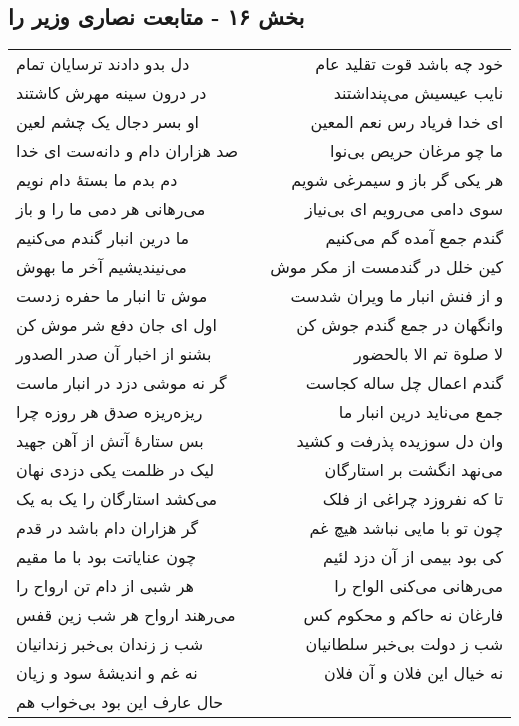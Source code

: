 \begin{center}
\section*{بخش ۱۶ - متابعت نصاری وزیر را}
\label{sec:sh016}
\begin{longtable}{l p{0.5cm} r}
دل بدو دادند ترسایان تمام
&&
خود چه باشد قوت تقلید عام
\\
در درون سینه مهرش کاشتند
&&
نایب عیسیش می‌پنداشتند
\\
او بسر دجال یک چشم لعین
&&
ای خدا فریاد رس نعم المعین
\\
صد هزاران دام و دانه‌ست ای خدا
&&
ما چو مرغان حریص بی‌نوا
\\
دم بدم ما بستهٔ دام نویم
&&
هر یکی گر باز و سیمرغی شویم
\\
می‌رهانی هر دمی ما را و باز
&&
سوی دامی می‌رویم ای بی‌نیاز
\\
ما درین انبار گندم می‌کنیم
&&
گندم جمع آمده گم می‌کنیم
\\
می‌نیندیشیم آخر ما بهوش
&&
کین خلل در گندمست از مکر موش
\\
موش تا انبار ما حفره زدست
&&
و از فنش انبار ما ویران شدست
\\
اول ای جان دفع شر موش کن
&&
وانگهان در جمع گندم جوش کن
\\
بشنو از اخبار آن صدر الصدور
&&
لا صلوة تم الا بالحضور
\\
گر نه موشی دزد در انبار ماست
&&
گندم اعمال چل ساله کجاست
\\
ریزه‌ریزه صدق هر روزه چرا
&&
جمع می‌ناید درین انبار ما
\\
بس ستارهٔ آتش از آهن جهید
&&
وان دل سوزیده پذرفت و کشید
\\
لیک در ظلمت یکی دزدی نهان
&&
می‌نهد انگشت بر استارگان
\\
می‌کشد استارگان را یک به یک
&&
تا که نفروزد چراغی از فلک
\\
گر هزاران دام باشد در قدم
&&
چون تو با مایی نباشد هیچ غم
\\
چون عنایاتت بود با ما مقیم
&&
کی بود بیمی از آن دزد لئیم
\\
هر شبی از دام تن ارواح را
&&
می‌رهانی می‌کنی الواح را
\\
می‌رهند ارواح هر شب زین قفس
&&
فارغان نه حاکم و محکوم کس
\\
شب ز زندان بی‌خبر زندانیان
&&
شب ز دولت بی‌خبر سلطانیان
\\
نه غم و اندیشهٔ سود و زیان
&&
نه خیال این فلان و آن فلان
\\
حال عارف این بود بی‌خواب هم

\end{longtable}
\end{center}
